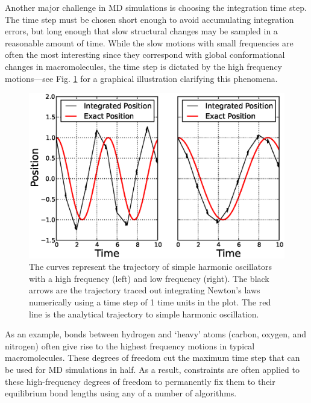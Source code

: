 Another major challenge in MD simulations is choosing the integration time step.
The time step must be chosen short enough to avoid accumulating integration
errors, but long enough that slow structural changes may be sampled in a
reasonable amount of time. While the slow motions with small frequencies are
often the most interesting since they correspond with global conformational
changes in macromolecules, the time step is dictated by the high frequency
motions---see Fig. \ref{fig1:TimeStepDemo} for a graphical illustration
clarifying this phenomena.

\begin{figure}
   \includegraphics[width=6.5in]{TimeStepDemo.ps}
   \caption{The curves represent the trajectory of simple harmonic oscillators
            with a high frequency (left) and low frequency (right). The black
            arrows are the trajectory traced out integrating Newton's laws
            numerically using a time step of 1 time units in the plot. The
            red line is the analytical trajectory to simple harmonic
            oscillation.}
   \label{fig1:TimeStepDemo}
\end{figure}

As an example, bonds between hydrogen and `heavy' atoms (\eg carbon, oxygen, and
nitrogen) often give rise to the highest frequency motions in typical
macromolecules. These degrees of freedom cut the maximum time step that can be
used for MD simulations in half. As a result, constraints are often applied to
these high-frequency degrees of freedom to permanently fix them to their
equilibrium bond lengths using any of a number of algorithms.
\cite{Ryckaert_JComputPhys_1977_v23_p327, Andersen1983,
Miyamoto_JComputChem_1992_v13_p952, Forester_JComputChem_1998_v19_p102,
Lee_JComputPhys_2005_v210_p171}

